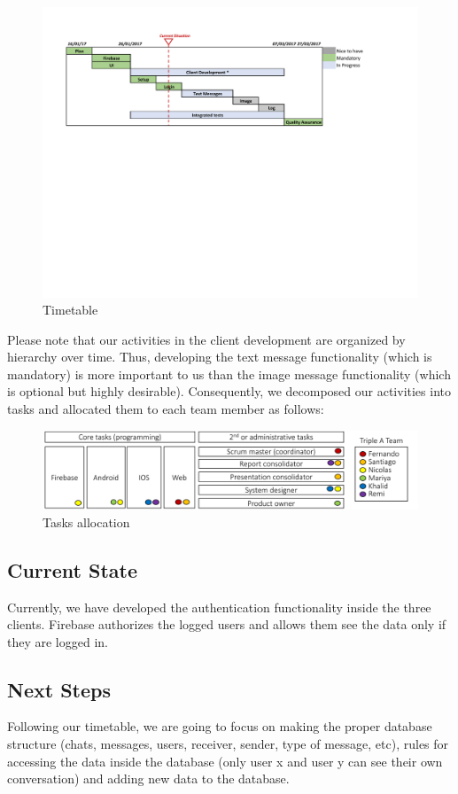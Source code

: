 \begin{figure}[t]
\centering
\includegraphics[width=1\textwidth]{figs/timetable}
	\caption{Timetable}
	\label{fig:timetable}
\end{figure}


Please note that our activities in the client development are organized by hierarchy over time. Thus, developing the text message functionality (which is mandatory) is more important to us than the image message functionality (which is optional but highly desirable). Consequently, we decomposed our activities into tasks and allocated them to each team member as follows:

\begin{figure}[ht]
\centering
\includegraphics[width=1\textwidth]{figs/tasks}
	\caption{Tasks allocation}
	\label{fig:Tasks}
\end{figure}

\subsection{Current State}
Currently, we have developed the authentication functionality inside the three clients. Firebase authorizes the logged users and allows them see the data only if they are logged in.

\subsection{Next Steps}
Following our timetable, we are going to focus on making the proper database structure (chats, messages, users, receiver, sender, type of message, etc), rules for accessing the data inside the database (only user x and user y can see their own conversation) and adding new data to the database.
